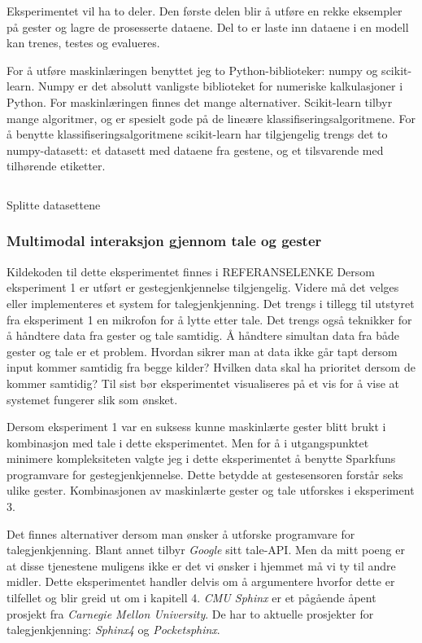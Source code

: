 Eksperimentet vil ha to deler. Den første delen blir å utføre en rekke eksempler på gester og lagre de prosesserte dataene. Del to er laste inn dataene i en modell kan trenes, testes og evalueres.  

For å utføre maskinlæringen benyttet jeg to Python-biblioteker: numpy og scikit-learn. Numpy er det absolutt vanligste biblioteket for numeriske kalkulasjoner i Python. For maskinlæringen finnes det mange alternativer. Scikit-learn tilbyr mange algoritmer, og er spesielt gode på de lineære klassifiseringsalgoritmene. For å benytte klassifiseringsalgoritmene scikit-learn har tilgjengelig trengs det to numpy-datasett: et datasett med dataene fra gestene, og et tilsvarende med tilhørende etiketter.

\begin{listing}[ht]
\inputminted[fontsize=\footnotesize]{python}{kodesnutter/split_data.py}
\label{code:split}
\caption{Splitte datasettene}
\end{listing}

\subsubsection{Multimodal interaksjon gjennom tale og gester}
{\color{red}Kildekoden til dette eksperimentet finnes i REFERANSELENKE}
Dersom eksperiment 1 er utført er gestegjenkjennelse tilgjengelig. Videre må det velges eller implementeres et system for talegjenkjenning. Det trengs i tillegg til utstyret fra eksperiment 1 en mikrofon for å lytte etter tale. Det trengs også teknikker for å håndtere data fra gester og tale samtidig. Å håndtere simultan data fra både gester og tale er et problem. Hvordan sikrer man at data ikke går tapt dersom input kommer samtidig fra begge kilder? Hvilken data skal ha prioritet dersom de kommer samtidig? Til sist bør eksperimentet visualiseres på et vis for å vise at systemet fungerer slik som ønsket.

Dersom eksperiment 1 var en suksess kunne maskinlærte gester blitt brukt i kombinasjon med tale i dette eksperimentet. Men for å i utgangspunktet minimere kompleksiteten valgte jeg i dette eksperimentet å benytte Sparkfuns programvare for gestegjenkjennelse. Dette betydde at gestesensoren forstår seks ulike gester. Kombinasjonen av maskinlærte gester og tale utforskes i eksperiment 3.

Det finnes alternativer dersom man ønsker å utforske programvare for talegjenkjenning. Blant annet tilbyr \emph{Google} sitt tale-API. Men da mitt poeng er at disse tjenestene muligens ikke er det vi ønsker i hjemmet må vi ty til andre midler. Dette eksperimentet handler delvis om å argumentere hvorfor dette er tilfellet og blir greid ut om i kapitell 4. \emph{CMU Sphinx} er et pågående åpent prosjekt fra \emph{Carnegie Mellon University}. De har to aktuelle prosjekter for talegjenkjenning: \emph{Sphinx4} og \emph{Pocketsphinx}.

